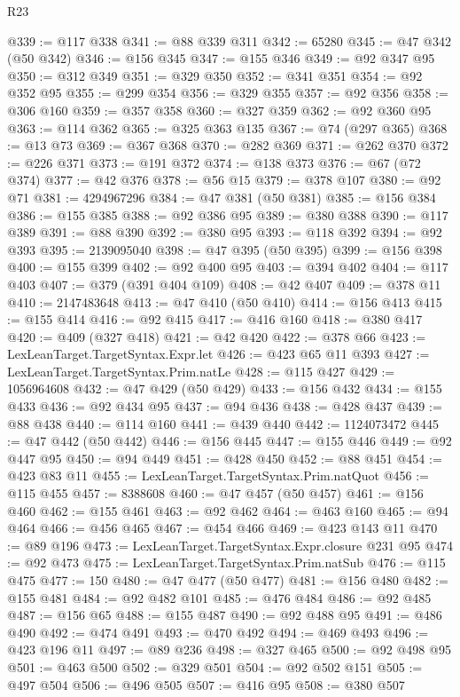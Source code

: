 \begin{lexlean}{R23}
\begin{coremodule}
@339 := @117 @338
@341 := @88 @339 @311
@342 := 65280
@345 := @47 @342 (@50 @342)
@346 := @156 @345
@347 := @155 @346
@349 := @92 @347 @95
@350 := @312 @349
@351 := @329 @350
@352 := @341 @351
@354 := @92 @352 @95
@355 := @299 @354
@356 := @329 @355
@357 := @92 @356
@358 := @306 @160
@359 := @357 @358
@360 := @327 @359
@362 := @92 @360 @95
@363 := @114 @362
@365 := @325 @363 @135
@367 := @74 (@297 @365)
@368 := @13 @73
@369 := @367 @368
@370 := @282 @369
@371 := @262 @370
@372 := @226 @371
@373 := @191 @372
@374 := @138 @373
@376 := @67 (@72 @374)
@377 := @42 @376
@378 := @56 @15
@379 := @378 @107
@380 := @92 @71
@381 := 4294967296
@384 := @47 @381 (@50 @381)
@385 := @156 @384
@386 := @155 @385
@388 := @92 @386 @95
@389 := @380 @388
@390 := @117 @389
@391 := @88 @390
@392 := @380 @95
@393 := @118 @392
@394 := @92 @393
@395 := 2139095040
@398 := @47 @395 (@50 @395)
@399 := @156 @398
@400 := @155 @399
@402 := @92 @400 @95
@403 := @394 @402
@404 := @117 @403
@407 := @379 (@391 @404 @109)
@408 := @42 @407
@409 := @378 @11
@410 := 2147483648
@413 := @47 @410 (@50 @410)
@414 := @156 @413
@415 := @155 @414
@416 := @92 @415
@417 := @416 @160
@418 := @380 @417
@420 := @409 (@327 @418)
@421 := @42 @420
@422 := @378 @66
@423 := LexLeanTarget.TargetSyntax.Expr.let
@426 := @423 @65 @11 @393
@427 := LexLeanTarget.TargetSyntax.Prim.natLe
@428 := @115 @427
@429 := 1056964608
@432 := @47 @429 (@50 @429)
@433 := @156 @432
@434 := @155 @433
@436 := @92 @434 @95
@437 := @94 @436
@438 := @428 @437
@439 := @88 @438
@440 := @114 @160
@441 := @439 @440
@442 := 1124073472
@445 := @47 @442 (@50 @442)
@446 := @156 @445
@447 := @155 @446
@449 := @92 @447 @95
@450 := @94 @449
@451 := @428 @450
@452 := @88 @451
@454 := @423 @83 @11
@455 := LexLeanTarget.TargetSyntax.Prim.natQuot
@456 := @115 @455
@457 := 8388608
@460 := @47 @457 (@50 @457)
@461 := @156 @460
@462 := @155 @461
@463 := @92 @462
@464 := @463 @160
@465 := @94 @464
@466 := @456 @465
@467 := @454 @466
@469 := @423 @143 @11
@470 := @89 @196
@473 := LexLeanTarget.TargetSyntax.Expr.closure @231 @95
@474 := @92 @473
@475 := LexLeanTarget.TargetSyntax.Prim.natSub
@476 := @115 @475
@477 := 150
@480 := @47 @477 (@50 @477)
@481 := @156 @480
@482 := @155 @481
@484 := @92 @482 @101
@485 := @476 @484
@486 := @92 @485
@487 := @156 @65
@488 := @155 @487
@490 := @92 @488 @95
@491 := @486 @490
@492 := @474 @491
@493 := @470 @492
@494 := @469 @493
@496 := @423 @196 @11
@497 := @89 @236
@498 := @327 @465
@500 := @92 @498 @95
@501 := @463 @500
@502 := @329 @501
@504 := @92 @502 @151
@505 := @497 @504
@506 := @496 @505
@507 := @416 @95
@508 := @380 @507

\end{coremodule}
\end{lexlean}
